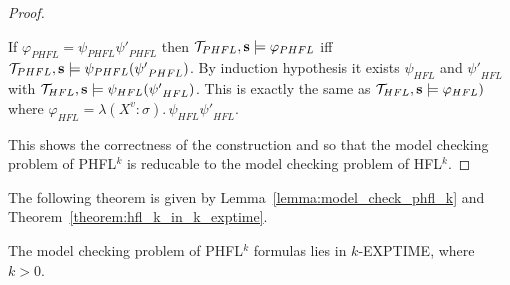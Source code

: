 \begin{proof}
\begin{compactitem}
        \item If $\varphi_{PHFL} = \psi_{PHFL}{\psi'}_{PHFL}$ then $\mathcal{T}_{PHFL}, \emph{s}
        \models \varphi_{PHFL}$ iff $\mathcal{T}_{PHFL}, \emph{s} \models \psi_{PHFL}({\psi'}_{PHFL})$. By induction
        hypothesis it exists $\psi_{HFL}$ and ${\psi'}_{HFL}$ with $\mathcal{T}_{HFL}, \emph{s} \models \psi_{HFL}
        ({\psi'}_{HFL})$. This is exactly the same as $\mathcal{T}_{HFL}, \emph{s} \models \varphi_{HFL})$
        where $\varphi_{HFL} = \lambda (X^v \colon \sigma).\,\psi_{HFL}{\psi'}_{HFL}$.
    \end{compactitem}
    This shows the correctness of the construction and so that the model checking problem of PHFL$^k$ is reducable to
    the model checking problem of HFL$^k$.
\end{proof}

The following theorem is given by Lemma~\ref{lemma:model_check_phfl_k} and Theorem~\ref{theorem:hfl_k_in_k_exptime}.

\begin{theorem}
    \label{theorem:phfl_k_in_k_exptime}
    The model checking problem of PHFL$^k$ formulas lies in $k$-EXPTIME, where $k > 0$.
\end{theorem}